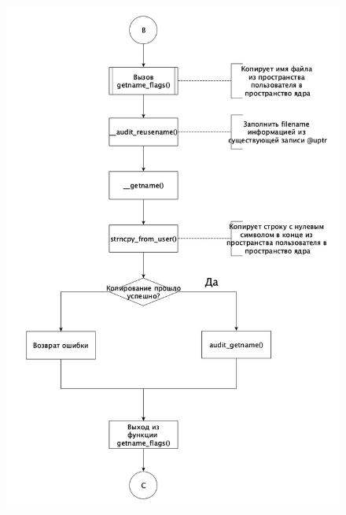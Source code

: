 \documentclass[a4paper,12pt]{article}
\begin{document}
	\begin{figure}[h!]
		\begin{center}
			{\includegraphics[scale = 0.9]{2.png}}
			\label{2}
		\end{center}
	\end{figure}
\end{document}
